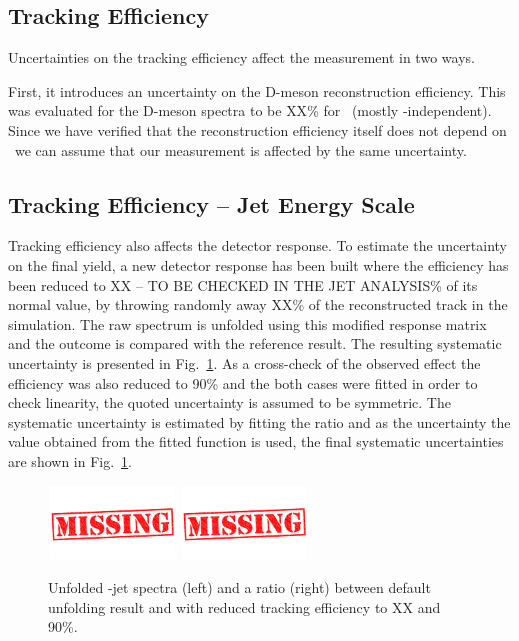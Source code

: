 \subsection{Tracking Efficiency}

Uncertainties on the tracking efficiency affect the measurement in two ways. 

First, it introduces an uncertainty on the D-meson reconstruction efficiency. This was evaluated for the D-meson spectra to be {\color{red} XX}\% for \Dzero\ (mostly \pt-independent). Since we have verified that the reconstruction efficiency itself does not depend on \ptchjet\ we can assume that our measurement is affected by the same uncertainty.

\subsection{Tracking Efficiency -- Jet Energy Scale}


Tracking efficiency also affects the detector response. To estimate the uncertainty on the final yield, a new detector response has been built where the efficiency has been reduced to {\color{red}XX -- TO BE CHECKED IN THE JET ANALYSIS}\% of its normal value, by throwing randomly away {\color{red}XX}\% of the reconstructed track in the simulation.
The raw spectrum is unfolded using this modified response matrix and the outcome is compared with the reference result. The resulting systematic uncertainty is presented in Fig.~\ref{fig:JESsys_Dzero}. As a cross-check of the observed effect the efficiency was also reduced to 90\% and the both cases were fitted in order to check linearity, the quoted uncertainty is assumed to be symmetric. 
The systematic uncertainty is estimated by fitting the ratio and as the uncertainty the value obtained from the fitted function is used, the final systematic uncertainties are shown in Fig.~\ref{fig:JESsys_Dzero}.


\begin{figure}[bth]
\centering
\includegraphics[width=0.3\textwidth]{missing}
\includegraphics[width=0.3\textwidth]{missing}
\caption{Unfolded \Dzero-jet spectra (left) and a ratio (right) between default unfolding result and with reduced tracking efficiency to {\color{red}XX} and 90\%.}
\label{fig:JESsys_Dzero}
\end{figure}


